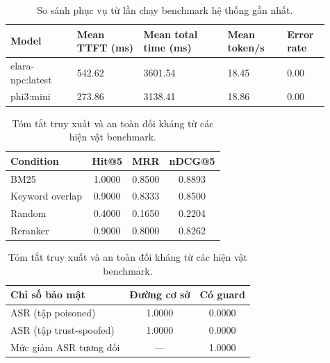 ﻿\documentclass[a4paper,12pt]{article}
\begin{document}
\begin{table}[H]
\centering
\caption{So sánh phục vụ từ lần chạy benchmark hệ thống gần nhất.}
\begingroup
\footnotesize
\setlength{\tabcolsep}{3pt}
\begin{tabular}{p{0.19\linewidth}p{0.19\linewidth}p{0.24\linewidth}p{0.17\linewidth}p{0.12\linewidth}}
\toprule
Model & Mean TTFT (ms) & Mean total time (ms) & Mean token/s & Error rate \\
\midrule
elara-npc:latest & 542.62 & 3601.54 & 18.45 & 0.00 \\
phi3:mini & 273.86 & 3138.41 & 18.86 & 0.00 \\
\bottomrule
\end{tabular}
\endgroup
\end{table}

\begin{table}[H]
\centering
\caption{Tóm tắt truy xuất và an toàn đối kháng từ các hiện vật benchmark.}
\begin{tabular}{lccc}
\toprule
Condition & Hit@5 & MRR & nDCG@5 \\
\midrule
BM25 & 1.0000 & 0.8500 & 0.8893 \\
Keyword overlap & 0.9000 & 0.8333 & 0.8500 \\
Random & 0.4000 & 0.1650 & 0.2204 \\
Reranker & 0.9000 & 0.8000 & 0.8262 \\
\bottomrule
\end{tabular}
\vspace{0.5em}

\begin{tabular}{lcc}
\toprule
Chỉ số bảo mật & Đường cơ sở & Có guard \\
\midrule
ASR (tập poisoned) & 1.0000 & 0.0000 \\
ASR (tập trust-spoofed) & 1.0000 & 0.0000 \\
Mức giảm ASR tương đối & --- & 1.0000 \\
\bottomrule
\end{tabular}
\end{table}
\end{document}
